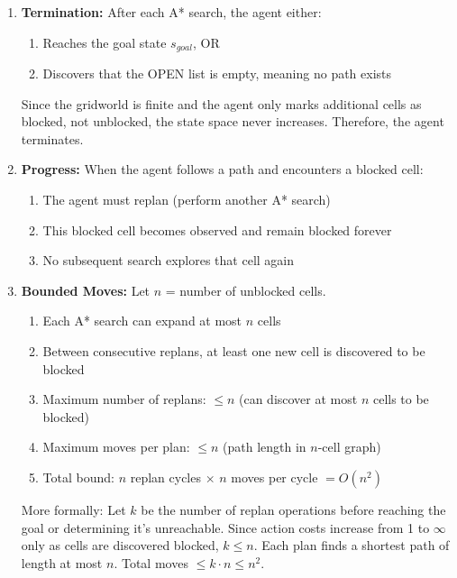 \documentclass[12pt]{article}
\begin{document}
\begin{enumerate}
    \item \textbf{Termination:} After each A* search, the agent either:
    \begin{enumerate}
        \item Reaches the goal state $s_{goal}$, OR
        \item Discovers that the OPEN list is empty, meaning no path exists
    \end{enumerate}
    Since the gridworld is finite and the agent only marks additional cells as blocked, not 
    unblocked, the state space never increases. Therefore, the agent terminates.

    \item \textbf{Progress:} When the agent follows a path and encounters a blocked cell:
    \begin{enumerate}
        \item The agent must replan (perform another A* search)
        \item This blocked cell becomes observed and remain blocked forever
        \item No subsequent search explores that cell again
    \end{enumerate}

    \item \textbf{Bounded Moves:} Let $n$ = number of unblocked cells.
    \begin{enumerate}
        \item Each A* search can expand at most $n$ cells
        \item Between consecutive replans, at least one new cell is discovered to be blocked
        \item Maximum number of replans: $\leq n$ (can discover at most $n$ cells to be blocked)
        \item Maximum moves per plan: $\leq n$ (path length in $n$-cell graph)
        \item Total bound: $n$ replan cycles $\times$ $n$ moves per cycle $= O(n^2)$
    \end{enumerate}

    More formally: Let $k$ be the number of replan operations before reaching the goal or 
    determining it's unreachable. Since action costs increase from 1 to $\infty$ only as cells 
    are discovered blocked, $k \leq n$. Each plan finds a shortest path of length at most $n$. 
    Total moves $\leq k \cdot n \leq n^2$.
\end{enumerate}
\end{document}
